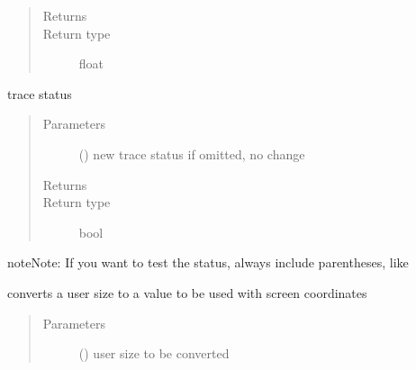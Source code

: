 \documentclass[letterpaper,10pt,english]{sphinxmanual}
\begin{document}
\begin{fulllineitems}
\begin{fulllineitems}
\begin{quote}
\begin{description}
\item[{Returns}] \leavevmode
{}

\item[{Return type}] \leavevmode
float

\end{description}\end{quote}

\end{fulllineitems}


\begin{fulllineitems}
\label{\detokenize{Reference:salabim.Environment.trace}}
trace status
\begin{quote}\begin{description}
\item[{Parameters}] \leavevmode
{} () \textendash{} new trace status 
if omitted, no change

\item[{Returns}] \leavevmode
{}

\item[{Return type}] \leavevmode
bool

\end{description}\end{quote}

\begin{sphinxadmonition}{note}{Note:}
If you want to test the status, always include
parentheses, like
\begin{quote}

\end{quote}
\end{sphinxadmonition}

\end{fulllineitems}


\begin{fulllineitems}
\label{\detokenize{Reference:salabim.Environment.user_to_screencoordinates_size}}
converts a user size to a value to be used with screen coordinates
\begin{quote}\begin{description}
\item[{Parameters}] \leavevmode
{} () \textendash{} user size to be converted


\end{description}
\end{quote}
\end{fulllineitems}
\end{fulllineitems}
\end{document}
